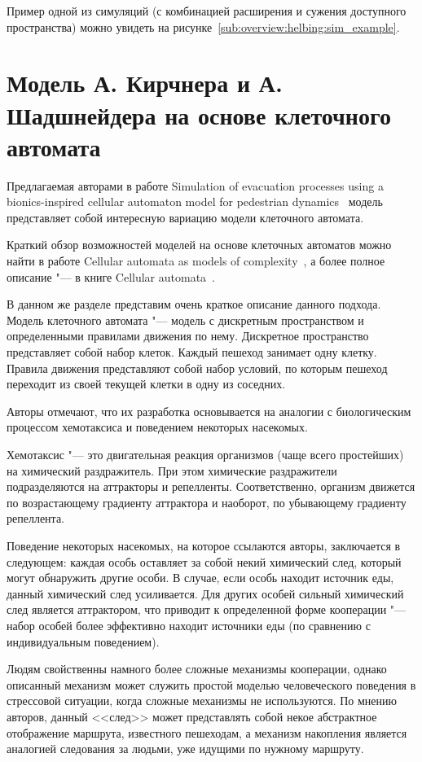 Пример одной из симуляций (с комбинацией расширения и сужения доступного пространства) можно увидеть на рисунке~\ref{sub:overview:helbing:sim_example}.


\section{Модель А. Кирчнера и А. Шадшнейдера на основе клеточного автомата}
\label{sub:overview:kirchner}

Предлагаемая авторами в работе Simulation of evacuation processes using a bionics-inspired cellular automaton model for pedestrian dynamics~\cite{kirchner2002simulation} модель представляет собой интересную вариацию модели клеточного автомата.

Краткий обзор возможностей моделей на основе клеточных автоматов можно найти в работе Cellular automata as models of complexity~\cite{wolfram1984cellular},
а более полное описание "--- в книге Cellular automata~\cite{chopard1998cellular}.

В данном же разделе представим очень краткое описание данного подхода.
Модель клеточного автомата "--- модель с дискретным пространством и определенными правилами движения по нему.
Дискретное пространство представляет собой набор клеток. Каждый пешеход занимает одну клетку.
Правила движения представляют собой набор условий, по которым пешеход переходит из своей текущей клетки в одну из соседних.

Авторы отмечают, что их разработка основывается на аналогии с биологическим процессом хемотаксиса и поведением некоторых насекомых.

Хемотаксис "--- это двигательная реакция организмов (чаще всего простейших) на химический раздражитель.
При этом химические раздражители подразделяются на аттракторы и репелленты.
Соответственно, организм движется по возрастающему градиенту аттрактора и наоборот, по убывающему градиенту репеллента.

Поведение некоторых насекомых, на которое ссылаются авторы, заключается в следующем:
каждая особь оставляет за собой некий химический след, который могут обнаружить другие особи.
В случае, если особь находит источник еды, данный химический след усиливается.
Для других особей сильный химический след является аттрактором, что приводит к определенной форме кооперации "---
набор особей более эффективно находит источники еды (по сравнению с индивидуальным поведением).

Людям свойственны намного более сложные механизмы кооперации, однако описанный механизм может служить простой моделью человеческого поведения в стрессовой ситуации,
когда сложные механизмы не используются. По мнению авторов, данный <<след>> может представлять собой некое абстрактное отображение маршрута, известного пешеходам,
а механизм накопления является аналогией следования за людьми, уже идущими по нужному маршруту.

